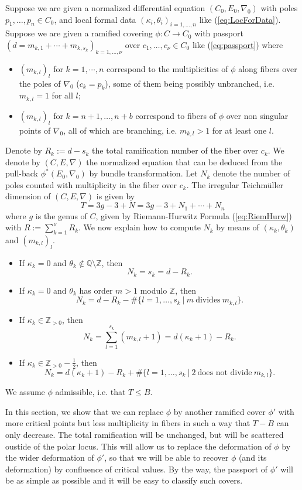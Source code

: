 \documentclass[12]{amsart}
\begin{document}
Suppose we are given a normalized differential equation $(C_0,E_0,\nabla_0)$ with poles $p_1,\ldots,p_n\in C_0$, and local formal data 
$(\kappa_i,\theta_i)_{i=1,\ldots,n}$ like (\ref{eq:LocForData}). Suppose we are given 
a ramified covering $\phi:C\to C_0$ with passport $(d=m_{k,1}+\cdots+m_{k,s_k})_{k=1,\ldots,\nu}$ over $c_1,\ldots,c_\nu\in C_0$ like (\ref{eq:passport})
where
\begin{itemize}
\item $(m_{k,l})_l$ for $k=1,\cdots,n$ correspond to the multiplicities of $\phi$ along fibers over the poles of $\nabla_0$ ($c_k=p_k$), some of them being possibly unbranched, i.e. $m_{k,l}=1$ for all $l$;
\item $(m_{k,l})_l$ for $k=n+1,\ldots,n+b$ correspond to fibers of $\phi$ over non singular points of $\nabla_0$,
all of which are branching, i.e. $m_{k,l}>1$ for at least one $l$.
\end{itemize}
Denote by $R_k:=d-s_k$ the total ramification number of the fiber over $c_k$. We denote by $(C,E,\nabla)$ the normalized
equation that can be deduced from the pull-back $\phi^*(E_0,\nabla_0)$ by bundle transformation. 
Let $N_k$ denote the number of poles counted with multiplicity in the fiber over $c_k$. 
The irregular Teichm\"uller dimension of $(C,E,\nabla)$ is given by 
$$T=3g-3+N=3g-3+N_1+\cdots+N_n$$
where $g$ is the genus of $C$, given by Riemann-Hurwitz Formula (\ref{eq:RiemHurw}) with $R:=\sum_{k=1}^\nu R_k$.
We now explain how to compute $N_k$ by means of $(\kappa_k,\theta_k)$ and $(m_{k,l})_l$.
\begin{itemize}
\item If $\kappa_k=0$ and $\theta_k\not\in\mathbb Q\setminus\mathbb Z$, then 
$$N_k=s_k=d-R_k.$$
\item If $\kappa_k=0$ and $\theta_k$ has order $m>1$ modulo $\mathbb Z$, then 
$$N_k=d-R_k-\#\{l=1,\ldots,s_k\ \vert\ m\ \text{divides}\ m_{k,l}\}.$$
\item If $\kappa_k\in\mathbb Z_{>0}$, then 
$$N_k=\sum_{l=1}^{s_k}(m_{k,l}+1)=d(\kappa_k+1)-R_k.$$
\item If $\kappa_k\in\mathbb Z_{>0}-\frac{1}{2}$, then
$$N_k=d(\kappa_k+1)-R_k+\#\{l=1,\ldots,s_k\ \vert\ 2\ \text{does not divide}\ m_{k,l}\}.$$
\end{itemize}
We assume $\phi$ admissible, i.e. that $T\le B$.

In this section, we show that we can replace $\phi$ by another ramified cover $\phi'$ with more 
critical points but less multiplicity in fibers in such a way that $T-B$ can only decrease. The total ramification
will be unchanged, but will be scattered oustide of the polar locus. This will
allow us to replace the deformation of $\phi$ by the wider deformation of $\phi'$, so that we will
be able to recover $\phi$ (and its deformation) by confluence of critical values. By the way,
the passport of $\phi'$ will be as simple as possible and it will be easy to classify such covers.
\end{document}
